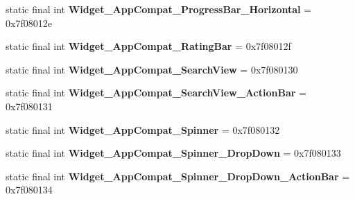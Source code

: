 \begin{DoxyCompactItemize}
\item 
\hypertarget{classandroid_1_1support_1_1design_1_1_r_1_1style_aa2e12a70a393c57a17d369b1e609d364}{}static final int {\bfseries Widget\+\_\+\+App\+Compat\+\_\+\+Progress\+Bar\+\_\+\+Horizontal} = 0x7f08012e\label{classandroid_1_1support_1_1design_1_1_r_1_1style_aa2e12a70a393c57a17d369b1e609d364}

\item 
\hypertarget{classandroid_1_1support_1_1design_1_1_r_1_1style_a5040616cea8d7da82220110548051e50}{}static final int {\bfseries Widget\+\_\+\+App\+Compat\+\_\+\+Rating\+Bar} = 0x7f08012f\label{classandroid_1_1support_1_1design_1_1_r_1_1style_a5040616cea8d7da82220110548051e50}

\item 
\hypertarget{classandroid_1_1support_1_1design_1_1_r_1_1style_af6d560de565321d15b4a69965fafa406}{}static final int {\bfseries Widget\+\_\+\+App\+Compat\+\_\+\+Search\+View} = 0x7f080130\label{classandroid_1_1support_1_1design_1_1_r_1_1style_af6d560de565321d15b4a69965fafa406}

\item 
\hypertarget{classandroid_1_1support_1_1design_1_1_r_1_1style_a2aa0a46a64702cbdf9aaa8e3429ab0ec}{}static final int {\bfseries Widget\+\_\+\+App\+Compat\+\_\+\+Search\+View\+\_\+\+Action\+Bar} = 0x7f080131\label{classandroid_1_1support_1_1design_1_1_r_1_1style_a2aa0a46a64702cbdf9aaa8e3429ab0ec}

\item 
\hypertarget{classandroid_1_1support_1_1design_1_1_r_1_1style_a4789d9d51f1b1f6f79df9813c334b06c}{}static final int {\bfseries Widget\+\_\+\+App\+Compat\+\_\+\+Spinner} = 0x7f080132\label{classandroid_1_1support_1_1design_1_1_r_1_1style_a4789d9d51f1b1f6f79df9813c334b06c}

\item 
\hypertarget{classandroid_1_1support_1_1design_1_1_r_1_1style_a9bff6276c861e1b86ed15d178ebb319f}{}static final int {\bfseries Widget\+\_\+\+App\+Compat\+\_\+\+Spinner\+\_\+\+Drop\+Down} = 0x7f080133\label{classandroid_1_1support_1_1design_1_1_r_1_1style_a9bff6276c861e1b86ed15d178ebb319f}

\item 
\hypertarget{classandroid_1_1support_1_1design_1_1_r_1_1style_ac9a5e8337a2d3ae56a72aff0816041ee}{}static final int {\bfseries Widget\+\_\+\+App\+Compat\+\_\+\+Spinner\+\_\+\+Drop\+Down\+\_\+\+Action\+Bar} = 0x7f080134\label{classandroid_1_1support_1_1design_1_1_r_1_1style_ac9a5e8337a2d3ae56a72aff0816041ee}


\end{DoxyCompactItemize}
